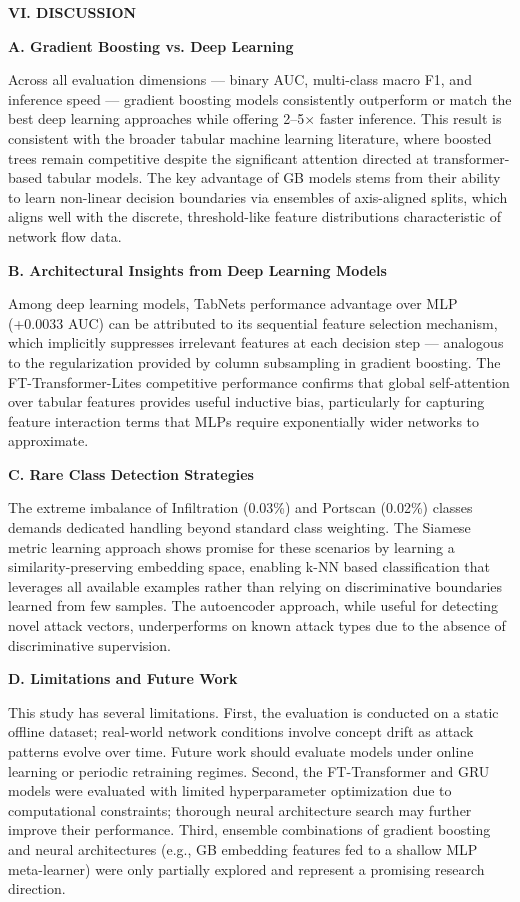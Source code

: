 \documentclass[
  journal,
  10pt]{IEEEtran}
\begin{document}
\textbf{VI. DISCUSSION}

\textbf{A. Gradient Boosting vs. Deep Learning}

Across all evaluation dimensions --- binary AUC, multi-class macro F1,
and inference speed --- gradient boosting models consistently outperform
or match the best deep learning approaches while offering 2--5× faster
inference. This result is consistent with the broader tabular machine
learning literature, where boosted trees remain competitive despite the
significant attention directed at transformer-based tabular models. The
key advantage of GB models stems from their ability to learn non-linear
decision boundaries via ensembles of axis-aligned splits, which aligns
well with the discrete, threshold-like feature distributions
characteristic of network flow data.

\textbf{B. Architectural Insights from Deep Learning Models}

Among deep learning models, TabNet\textquotesingle s performance
advantage over MLP (+0.0033 AUC) can be attributed to its sequential
feature selection mechanism, which implicitly suppresses irrelevant
features at each decision step --- analogous to the regularization
provided by column subsampling in gradient boosting. The
FT-Transformer-Lite\textquotesingle s competitive performance confirms
that global self-attention over tabular features provides useful
inductive bias, particularly for capturing feature interaction terms
that MLPs require exponentially wider networks to approximate.

\textbf{C. Rare Class Detection Strategies}

The extreme imbalance of Infiltration (0.03\%) and Portscan (0.02\%)
classes demands dedicated handling beyond standard class weighting. The
Siamese metric learning approach shows promise for these scenarios by
learning a similarity-preserving embedding space, enabling k-NN based
classification that leverages all available examples rather than relying
on discriminative boundaries learned from few samples. The autoencoder
approach, while useful for detecting novel attack vectors, underperforms
on known attack types due to the absence of discriminative supervision.

\textbf{D. Limitations and Future Work}

This study has several limitations. First, the evaluation is conducted
on a static offline dataset; real-world network conditions involve
concept drift as attack patterns evolve over time. Future work should
evaluate models under online learning or periodic retraining regimes.
Second, the FT-Transformer and GRU models were evaluated with limited
hyperparameter optimization due to computational constraints; thorough
neural architecture search may further improve their performance. Third,
ensemble combinations of gradient boosting and neural architectures
(e.g., GB embedding features fed to a shallow MLP meta-learner) were
only partially explored and represent a promising research direction.
\end{document}
